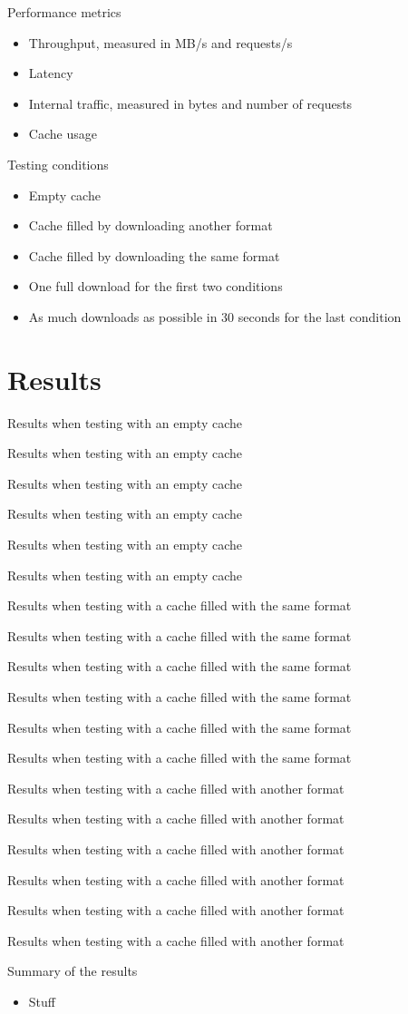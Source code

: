\documentclass[xcolor=svgnames]{beamer}
\begin{document}
\begin{frame}{Performance metrics}
    \begin{itemize}
        \item Throughput, measured in MB/s and requests/s
        \item Latency
        \item Internal traffic, measured in bytes and number of requests
        \item Cache usage
    \end{itemize}
\end{frame}


\begin{frame}{Testing conditions}
    \begin{itemize}
        \item Empty cache
        \item Cache filled by downloading another format
        \item Cache filled by downloading the same format
        \item One full download for the first two conditions
        \item As much downloads as possible in 30 seconds for the last condition
    \end{itemize}
\end{frame}

\section{Results}
\newcommand{\frameplot}[3]{%
    \begin{frame}{Results when testing with #1}
        
    \end{frame}
}

\newcommand{\plotframes}[2]{%
    \frameplot{#1}{#2}{cache_usage}
    \frameplot{#1}{#2}{internal_requests}
    \frameplot{#1}{#2}{internal_mb}
    \frameplot{#1}{#2}{mbps}
    \frameplot{#1}{#2}{requests_per_second}
    \frameplot{#1}{#2}{latency_mean}
}

\plotframes{an empty cache}{first_time}
\plotframes{a cache filled with the same format}{second_time}
\plotframes{a cache filled with another format}{after_other}

\begin{frame}{Summary of the results}
    \begin{itemize}
        \item Stuff
    \end{itemize}
\end{frame}
\end{document}
